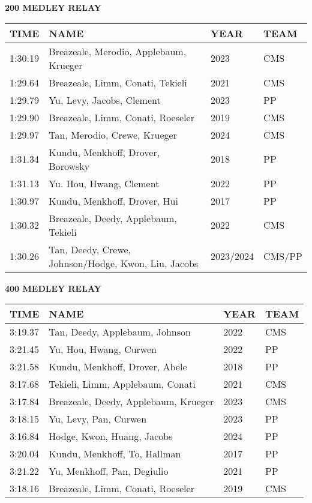 \begin{center}
\begin{minipage}[t]{0.7\textwidth}
\centering
\textbf{200 MEDLEY RELAY}\\[0.05cm]
\begin{tabular}{@{}p{1.8cm}p{2.8cm}p{1.2cm}p{1.4cm}@{}}
\hline
\textbf{TIME} & \textbf{NAME} & \textbf{YEAR} & \textbf{TEAM} \\
\hline
1:30.19 & Breazeale, Merodio, Applebaum, Krueger & 2023 & CMS \\
1:29.64 & Breazeale, Limm, Conati, Tekieli & 2021 & CMS \\
1:29.79 & Yu, Levy, Jacobs, Clement & 2023 & PP \\
1:29.90 & Breazeale, Limm, Conati, Roeseler & 2019 & CMS \\
1:29.97 & Tan, Merodio, Crewe, Krueger & 2024 & CMS \\
1:31.34 & Kundu, Menkhoff, Drover, Borowsky & 2018 & PP \\
1:31.13 & Yu. Hou, Hwang, Clement & 2022 & PP \\
1:30.97 & Kundu, Menkhoff, Drover, Hui & 2017 & PP \\
1:30.32 & Breazeale, Deedy, Applebaum, Tekieli & 2022 & CMS \\
1:30.26 & Tan, Deedy, Crewe, Johnson/Hodge, Kwon, Liu, Jacobs & 2023/2024 & CMS/PP \\
\hline
\end{tabular}
\end{minipage}
\end{center}

\vspace{0.4cm}

\begin{center}
\begin{minipage}[t]{0.7\textwidth}
\centering
\textbf{400 MEDLEY RELAY}\\[0.05cm]
\begin{tabular}{@{}p{1.8cm}p{2.8cm}p{1.2cm}p{1.4cm}@{}}
\hline
\textbf{TIME} & \textbf{NAME} & \textbf{YEAR} & \textbf{TEAM} \\
\hline
3:19.37 & Tan, Deedy, Applebaum, Johnson & 2022 & CMS \\
3:21.45 & Yu, Hou, Hwang, Curwen & 2022 & PP \\
3:21.58 & Kundu, Menkhoff, Drover, Abele & 2018 & PP \\
3:17.68 & Tekieli, Limm, Applebaum, Conati & 2021 & CMS \\
3:17.84 & Breazeale, Deedy, Applebaum, Krueger & 2023 & CMS \\
3:18.15 & Yu, Levy, Pan, Curwen & 2023 & PP \\
3:16.84 & Hodge, Kwon, Huang, Jacobs & 2024 & PP \\
3:20.04 & Kundu, Menkhoff, To, Hallman & 2017 & PP \\
3:21.22 & Yu, Menkhoff, Pan, Degiulio & 2021 & PP \\
3:18.16 & Breazeale, Limm, Conati, Roeseler & 2019 & CMS \\
\hline
\end{tabular}
\end{minipage}
\end{center}

